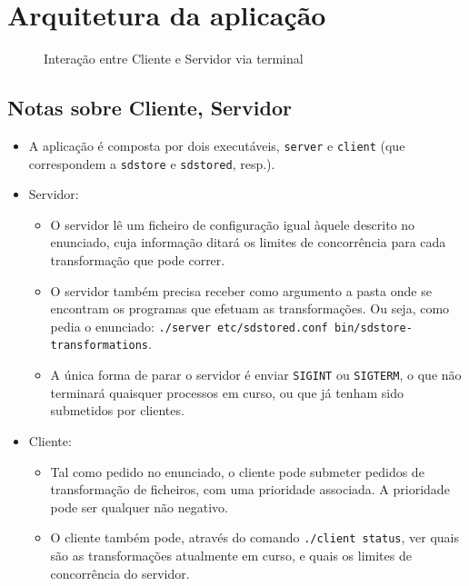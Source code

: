 \documentclass[11pt,a4paper]{report}%
\begin{document}
\chapter{Arquitetura da aplicação} \label{chap:analysis} %

\begin{figure}
  \centering
  
  \caption{Interação entre Cliente e Servidor via terminal}
\end{figure}

\newpage

\section{Notas sobre Cliente, Servidor}

\begin{itemize}
  \item A aplicação é composta por dois executáveis, \texttt{server} e \texttt{client}
  (que correspondem a \texttt{sdstore} e \texttt{sdstored}, resp.).
  \item Servidor:
  \begin{itemize}
    \item O servidor lê um ficheiro de configuração igual àquele descrito no enunciado,
    cuja informação ditará os limites de concorrência para cada transformação que pode correr.
    \item O servidor também precisa receber como argumento a pasta onde se encontram
    os programas que efetuam as transformações. Ou seja, como pedia o enunciado:
    \texttt{./server etc/sdstored.conf bin/sdstore-transformations}.
    \item A única forma de parar o servidor é enviar \texttt{SIGINT} ou \texttt{SIGTERM},
    o que não terminará quaisquer processos em curso, ou que já tenham sido submetidos por clientes.
  \end{itemize}

  \item Cliente:
  \begin{itemize}
    \item Tal como pedido no enunciado, o cliente pode submeter pedidos de transformação
    de ficheiros, com uma prioridade associada. A prioridade pode ser qualquer não negativo.
    \item O cliente também pode, através do comando \texttt{./client status}, ver quais são as
    transformações atualmente em curso, e quais os limites de concorrência do servidor.
  \end{itemize}
\end{itemize}
\end{document}
